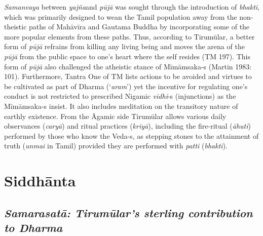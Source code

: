 \textit{Samanvaya} between \textit{yajña}and \textit{pūjā} was sought through the introduction of \textit{bhakti}, which was primarily designed to wean the Tamil population away from the non-theistic paths of Mahāvīra and Gautama Buddha by incorporating some of the more popular elements from these paths. Thus, according to Tirumūlar, a better form of \textit{pūjā} refrains from killing any living being and moves the arena of the \textit{pūjā} from the public space to one’s heart where the self resides (TM 197). This form of \textit{pūjā} also challenged the atheistic stance of Mīmāmsaka-s (Martin 1983: 101). Furthermore, Tantra One of TM lists actions to be avoided and virtues to be cultivated as part of Dharma (‘\textit{aram}’) yet the incentive for regulating one's conduct is not restricted to prescribed Nigamic \textit{vidhi}-s (injunctions) as the Mīmāmsaka-s insist. It also includes meditation on the transitory nature of earthly existence. From the Āgamic side Tirumūlar allows various daily observances (\textit{caryā}) and ritual practices (\textit{kriyā}), including the fire-ritual (\textit{āhuti}) performed by those who know the Veda-s, as stepping stones to the attainment of truth (\textit{unmai} in Tamil) provided they are performed with \textit{patti} (\textit{bhakti}).


\section*{Siddhānta}

\subsection*{\textit{Samarasatā: Tirumūlar’s sterling contribution to Dharma}}

